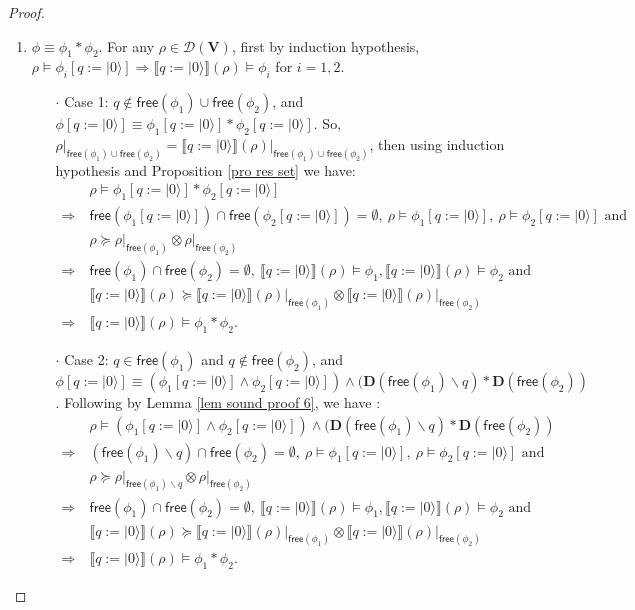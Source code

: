 \documentclass[conference,compsoc, 10pt]{IEEEtran}
\newcommand {\qI} {{q:=|0\rangle}}
\newcommand {\cD } {{\mathcal{D}}}
\newcommand {\bD} {{\mathbf{D}}}
\newcommand {\free }[1] {{\mathsf{free}\left(#1\right)}}
\newcommand {\rt }[2] {{\left.{#1}\right|_{#2}}}
\newcommand {\vars } {\mathbf{V}}
\newcommand {\sem}[1] {\llbracket#1\rrbracket}
\begin{document}
\begin{appendices}
\begin{proof}
\begin{enumerate}
				\item $\phi \equiv \phi_1\ast\phi_2$. For any $\rho\in\cD(\vars)$, first by induction hypothesis, $\rho\models\phi_i[\qI]\Rightarrow\sem{\qI}(\rho)\models\phi_i$ for $i = 1,2$. 
				\begin{itemize}
					\item[$\cdot$]Case 1: $q\notin\free{\phi_1}\cup\free{\phi_2}$, and $\phi[\qI]\equiv \phi_1[\qI] \ast \phi_2[\qI]$. So, $\rt{\rho}{\free{\phi_1}\cup\free{\phi_2}} = \rt{\sem{\qI}(\rho)}{\free{\phi_1}\cup\free{\phi_2}}$, then using induction hypothesis and Proposition \ref{pro res set} we have:
					\begin{align*}
					&\rho\models\phi_1[\qI] \ast \phi_2[\qI] \\
					\Longrightarrow\ &\free{\phi_1[\qI]}\cap\free{\phi_2[\qI]} = \emptyset,\ \rho\models\phi_1[\qI],\ \rho\models\phi_2[\qI] \text{\ and\ }\\
					& \rho\succeq\rt{\rho}{\free{\phi_1}}\otimes\rt{\rho}{\free{\phi_2}} \\
					\Longrightarrow\ &\free{\phi_1}\cap\free{\phi_2} = \emptyset,\ \sem{\qI}(\rho)\models\phi_1, \sem{\qI}(\rho)\models\phi_2 \text{\ and\ }\\
					&\sem{\qI}(\rho)\succeq\rt{\sem{\qI}(\rho)}{\free{\phi_1}}\otimes\rt{\sem{\qI}(\rho)}{\free{\phi_2}} \\
					\Longrightarrow\ &\sem{\qI}(\rho)\models\phi_1\ast\phi_2. 
					\end{align*}	
					\item[$\cdot$]Case 2: $q\in\free{\phi_1}$ and $q\notin\free{\phi_2}$, and  $\phi[\qI]\equiv (\phi_1[\qI] \wedge \phi_2[\qI])\wedge(\bD(\free{\phi_1}\backslash q)\ast\bD(\free{\phi_2})$. Following by Lemma \ref{lem sound proof 6}, we have :				
					\begin{align*}
					&\rho\models(\phi_1[\qI] \wedge \phi_2[\qI])\wedge(\bD(\free{\phi_1}\backslash q)\ast\bD(\free{\phi_2}) \\
					\Longrightarrow\ &(\free{\phi_1}\backslash q)\cap\free{\phi_2} = \emptyset,\ \rho\models\phi_1[\qI],\ \rho\models\phi_2[\qI] \text{\ and\ }\\
					& \rho\succeq\rt{\rho}{\free{\phi_1}\backslash q}\otimes\rt{\rho}{\free{\phi_2}} \\
					\Longrightarrow\ &\free{\phi_1}\cap\free{\phi_2} = \emptyset,\ \sem{\qI}(\rho)\models\phi_1, \sem{\qI}(\rho)\models\phi_2 \text{\ and\ }\\
					&\sem{\qI}(\rho)\succeq\rt{\sem{\qI}(\rho)}{\free{\phi_1}}\otimes\rt{\sem{\qI}(\rho)}{\free{\phi_2}} \\
					\Longrightarrow\ &\sem{\qI}(\rho)\models\phi_1\ast\phi_2. 
					\end{align*}			
				\end{itemize}
				

\end{enumerate}
\end{proof}
\end{appendices}
\end{document}
